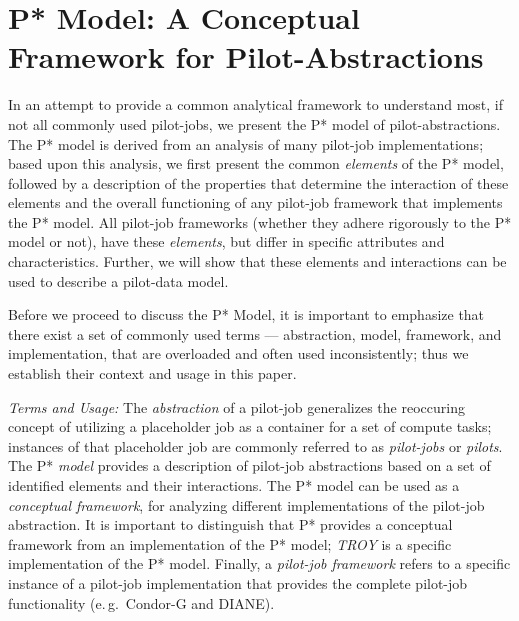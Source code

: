 \documentclass[conference,final]{IEEEtran}
\newcommand{\jhanote}[1]{ {\textcolor{red} { ***shantenu: #1 }}}
\newcommand{\jhanote}[1]{}
\newcommand{\upp}{\vspace*{-0.5em}}
\begin{document}
\section{P* Model: A Conceptual Framework for Pilot-Abstractions\upp\upp}
\label{sec:pilot-model}

In an attempt to provide a common analytical framework to understand
most, if not all commonly used pilot-jobs, we present the P* model of
pilot-abstractions. The P* model is derived from an analysis of many
pilot-job implementations; based upon this analysis, we first present
the common {\it elements} of the P* model, followed by a description
of the properties that determine the interaction of these elements and
the overall functioning of any pilot-job framework that implements the
P* model. All pilot-job frameworks (whether they adhere rigorously to
the P* model or not), have these {\it elements}, but differ in
specific attributes and characteristics.  Further, we will show that
these elements and interactions can be used to describe a pilot-data
model.
 
Before we proceed to discuss the P* Model, it is important to
emphasize that there exist a set of commonly used terms ---
abstraction, model, framework, and implementation, that are overloaded
and often used inconsistently; thus we establish their context and
usage in this paper.

\emph{Terms and Usage:} The \emph{ abstraction} of a pilot-job
generalizes the reoccuring concept of utilizing a placeholder job as a
container for a set of compute tasks; instances of that placeholder
job are commonly referred to as \emph{pilot-jobs} or \emph{pilots}.
The P* \emph{model} provides a %
description of pilot-job abstractions based on a set of identified
elements and their interactions. The P* model can be used as a {\it
  conceptual framework}, for analyzing different implementations of
the pilot-job abstraction.  It is important to distinguish that P*
provides a conceptual framework from an implementation of the P*
model; \emph{TROY} is a specific implementation of the P* model.
Finally, a \emph{pilot-job framework} refers to a specific instance of
a pilot-job implementation that provides the complete pilot-job
functionality (e.\,g.\ Condor-G and DIANE).

\end{document}

